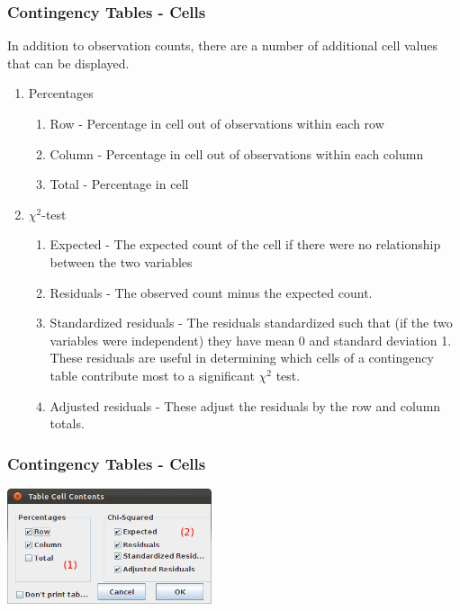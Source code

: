 \documentclass[xcolor={table},c]{beamer}
\begin{document}
\begin{frame}[shrink=5]\frametitle{Contingency Tables - Cells}
 In addition to observation counts, there are a number of additional cell values that can be displayed.
\begin{enumerate}[<+->]
\item Percentages
\begin{enumerate}
  \item Row - Percentage in cell out of observations within each row
  \item Column - Percentage in cell out of observations within each column
  \item Total - Percentage in cell 
\end{enumerate}
\item $\chi^2$-test
\begin{enumerate}[<+->]
\item Expected - The expected count of the cell if there were no relationship between the two variables
\item Residuals - The observed count minus the expected count.
\item Standardized residuals - The residuals standardized such that (if the two variables were independent) they have mean 0 and standard deviation 1. These residuals are useful in determining which cells of a contingency table contribute most to a significant $\chi^2$ test.
\item Adjusted residuals - These adjust the residuals by the row and column totals. 
\end{enumerate}
\end{enumerate}
\end{frame}

\begin{frame}\frametitle{Contingency Tables - Cells}
\begin{center}
\includegraphics[width=6cm]{conting3.png}
\end{center}
\end{frame}
\end{document}
